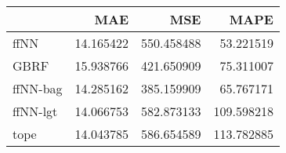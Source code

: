 \begin{tabular}{lrrr}
\toprule
{} &        MAE &         MSE &        MAPE \\
\midrule
ffNN     &  14.165422 &  550.458488 &   53.221519 \\
GBRF     &  15.938766 &  421.650909 &   75.311007 \\
ffNN-bag &  14.285162 &  385.159909 &   65.767171 \\
ffNN-lgt &  14.066753 &  582.873133 &  109.598218 \\
tope     &  14.043785 &  586.654589 &  113.782885 \\
\bottomrule
\end{tabular}
